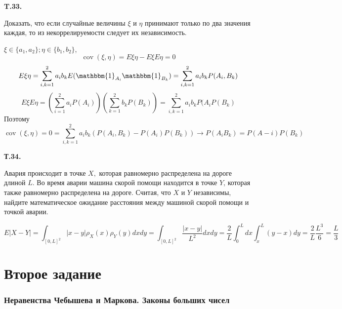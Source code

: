 \documentclass[a4paper,12pt]{article} %
\begin{document}
\begin{example}\textbf{T.33. }


Доказать, что если случайные величины $\xi$ и $\eta$ принимают только
по два значения каждая, то из некоррелируемости следует их независимость.


$ \xi\in \{a_1, a_2\}; \eta \in \{b_1, b_2\}$,
\[ \operatorname{cov}(\xi,\eta)= E\xi\eta -E\xi E\eta=0 \]
\[ E\xi\eta =\sum_{i,k=1}^{2}a_ib_k E(\mathbbm{1}_{A_i} \mathbbm{1}_{B_k})=
\sum_{i,k=1}^{2} a_ib_k P(A_i, B_k)
 \]
\[ E\xi E\eta = (
\sum_{i=1}^{2} a_i P(A_i))
(\sum_{k=1}^{2} b_k P( B_k))=
\sum_{i,k=1}^{2} a_ib_k P(A_i P(B_k) \]
Поэтому 
\[ \operatorname{cov}(\xi,\eta)=0=
\sum_{i,k=1}^{2} a_ib_k (P(A_i, B_k)-P(A_i)P(B_k)) \rightarrow P(A_iB_k)=P(A-i)P(B_k)\]


\end{example}





\begin{example} \textbf{Т.34. }


Авария происходит в точке $X,$ которая равномерно распределена на дороге длиной $L .$ 
Во время аварии машина скорой помощи находится в точке $Y$, которая также равномерно распределена на дороге. 
Считая, что $X$ и $Y$ независимы, найдите математическое ожидание расстояния между машиной скорой помощи и точкой аварии.


\[ E|X-Y|= \int_{[0,L]^2} |x-y| \rho_X (x) \rho_Y(y) dx dy = 
\int_{[0,L]^2} \frac{|x-y|}{L^2} dx dy=\frac{2}{L}\int_0^L dx \int_{x}^{L} (y-x) dy =\frac{2}{L}\frac{L^3}{6} =\frac{L}{3} \]








\end{example}














\clearpage
\part{Второе задание}


\section{Неравенства Чебышева и Маркова. Законы больших чисел}
\end{document}
